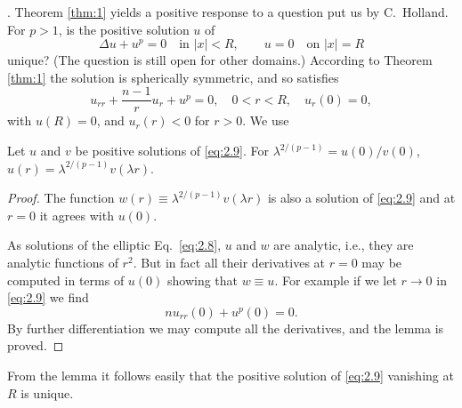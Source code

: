 . Theorem \ref{thm:1} yields a positive response to a question put us by C.~Holland.
For $p > 1$, is the positive solution $u$ of
\begin{equation}\label{eq:2.8}
  \Delta u + u^p = 0\quad \text{in } |x|<R,\qquad u = 0\quad \text{on } |x|=R
\end{equation}
unique? (The question is still open for other domains.)
According to Theorem \ref{thm:1} the solution is spherically symmetric, and so satisfies
\begin{equation}\label{eq:2.9}
  u_{rr} + \frac{n-1}{r} u_r + u^p = 0, \quad 0<r<R, \quad u_r(0) = 0,
\end{equation}
with $u(R) = 0$, and $u_r(r)<0$ for $r>0$. We use

\begin{lemma}\label{lemma:2.3}
  Let $u$ and $v$ be positive solutions of \eqref{eq:2.9}.
  For $\lambda^{2/(p-1)} = u(0)/v(0)$, $u(r) = \lambda^{2/(p-1)}v(\lambda r)$.
\end{lemma}

\begin{proof}
  The function $w(r)\equiv \lambda^{2/(p-1)}v(\lambda r)$
  is also a solution of \eqref{eq:2.9} and at $r=0$ it agrees with $u(0)$.

  As solutions of the elliptic Eq.~\eqref{eq:2.8}, $u$ and $w$ are analytic, i.e.,
  they are analytic functions of $r^2$. 
  But in fact all their derivatives at $r = 0$ may be computed in terms of $u(0)$
  showing that $w\equiv u$. For example if we let $r\to 0$ in \eqref{eq:2.9} we find
  \[nu_{rr}(0) + u^p(0) = 0.\]
  By further differentiation we may compute all the derivatives, and the lemma is proved.
\end{proof}

From the lemma it follows easily that the positive solution of \eqref{eq:2.9}
vanishing at $R$ is unique.